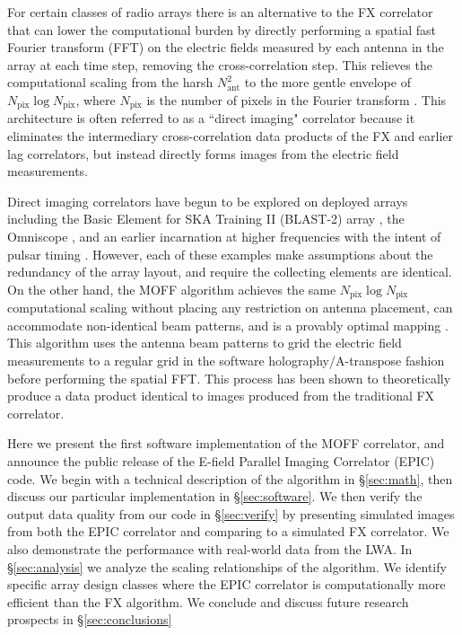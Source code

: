 \documentclass[a4paper,fleqn,usenatbib]{../mnras}
\newcommand{\Nant}{N_{\text{ant}}}
\newcommand{\Npix}{N_{\text{pix}}}
\begin{document}
For certain classes of radio arrays there is an alternative to the FX correlator that can lower the computational burden by directly performing a spatial fast Fourier transform (FFT) on the electric fields measured by each antenna in the array at each time step, removing the cross-correlation step. This relieves the computational scaling from the harsh $\Nant^2$ to the more gentle envelope of $\Npix\log\Npix$, where $\Npix$ is the number of pixels in the Fourier transform \citep[e.g.][]{mor11,teg09,teg10}. This architecture is often referred to as a ``direct imaging" correlator because it eliminates the intermediary cross-correlation data products of the FX and earlier lag correlators, but instead directly forms images from the electric field measurements.

Direct imaging correlators have begun to be explored on deployed arrays including the Basic Element for SKA Training II (BLAST-2) array \citep{fos14}, the Omniscope \citep{zhe14}, and an earlier incarnation at higher frequencies with the intent of pulsar timing \citep{oto94, dai00}. However, each of these examples make assumptions about the redundancy of the array layout, and require the collecting elements are identical. On the other hand, the MOFF algorithm achieves the same $\Npix \log \Npix$ computational scaling without placing any restriction on antenna placement, can accommodate non-identical beam patterns, and is a provably optimal mapping \citep{mor11}. This algorithm uses the antenna beam patterns to grid the electric field measurements to a regular grid in the software holography/A-transpose fashion \citep{mor09, bha08, teg97} before performing the spatial FFT. This process has been shown to theoretically produce a data product identical to images produced from the traditional FX correlator.

Here we present the first software implementation of the MOFF correlator, and announce the public release of the E-field Parallel Imaging Correlator (EPIC) code. We begin with a technical description of the algorithm in \S \ref{sec:math}, then discuss our particular implementation in \S \ref{sec:software}. We then verify the output data quality from our code in \S \ref{sec:verify} by presenting simulated images from both the EPIC correlator and comparing to a simulated FX correlator. We also demonstrate the performance with real-world data from the LWA. In \S \ref{sec:analysis} we analyze the scaling relationships of the algorithm. We identify specific array design classes where the EPIC correlator is computationally more efficient than the FX algorithm. We conclude and discuss future research prospects in \S\ref{sec:conclusions}
\end{document}
